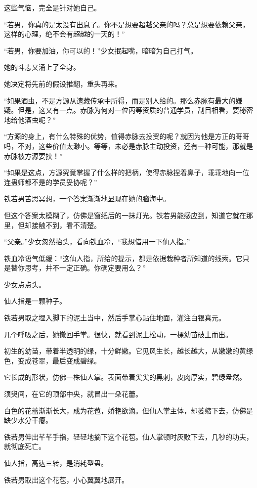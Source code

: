 \begin{this_body}
这些气恼，完全是针对她自己。

“若男，你真的是太没有出息了。你不是想要超越父亲的吗？总是想要依赖父亲，这样的心理，绝不会有超越的一天的！”

“若男，你要加油，你可以的！”少女抿起嘴，暗暗为自己打气。

她的斗志又涌上了全身。

她决定将先前的假设推翻，重头再来。

“如果酒虫，不是方源从遗藏传承中所得，而是别人给的。那么赤脉有最大的嫌疑。但是，这又有一点。赤脉为何对一位丙等资质的普通学员，刮目相看，要秘密地给他酒虫呢？”

“方源的身上，有什么特殊的优势，值得赤脉去投资的呢？就因为他是方正的哥哥吗，不对，这些价值太渺小。等等，未必是赤脉主动投资，还有一种可能，那就是赤脉被方源要挟！”

“如果是这点，方源究竟掌握了什么样的把柄，使得赤脉捏着鼻子，乖乖地向一位连蛊师都不是的学员妥协呢？”

铁若男苦思冥想，一个答案渐渐地显现在她的脑海中。

但这个答案太模糊了，仿佛是窗纸后的一抹灯光。铁若男能感应到，知道它就在那里，但却接触不到，看不清楚。

“父亲。”少女忽然抬头，看向铁血冷，“我想借用一下仙人指。”

铁血冷语气低缓：“这仙人指，所给的提示，都是依据栽种者所知道的线索。它只是替你思考，并不一定正确。你确定要用么？”

少女点点头。

仙人指是一颗种子。

铁若男取之埋入脚下的泥土当中，然后手掌心贴住地面，灌注白银真元。

几个呼吸之后，她撤回手掌。很快，就看到泥土松动，一棵幼苗破土而出。

初生的幼苗，带着半透明的绿，十分鲜嫩。它见风生长，越长越大，从嫩嫩的黄绿色，变成苍翠，最后变成碧绿。

它长成的形状，仿佛一株仙人掌。表面带着尖尖的黑刺，皮肉厚实，碧绿盎然。

须臾间，在它的顶部中央，就冒出一朵花蕾。

白色的花蕾渐渐长大，成为花苞，娇艳欲滴。但仙人掌主体，却萎缩下去，仿佛是缺少水分干瘪。

铁若男伸出芊芊手指，轻轻地摘下这个花苞。仙人掌顿时灰败下去，几秒的功夫，就彻底死亡。

仙人指，高达三转，是消耗型蛊。

铁若男取出这个花苞，小心翼翼地展开。


\end{this_body}
